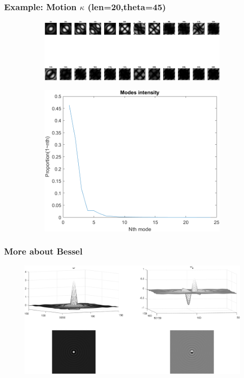 \documentclass[UTF8]{beamer}
\begin{document}
\begin{frame} \frametitle{Example: Motion $\kappa$ (len=20,theta=45)}
\begin{figure}[H]
\centering
\begin{subfigure}{1\textwidth}
    \centering
    \includegraphics[width=0.9\linewidth]{../figures/ex_motion.png}  
    \label{fig:modes_u}
 \end{subfigure}
 \begin{subfigure}{1\textwidth}
    \centering
    \includegraphics[width=.5\linewidth]{../figures/ex_motion_s.png}  
    \label{fig:modes_u_phaze}
 \end{subfigure}
 \end{figure}
\end{frame}

\begin{frame} \frametitle{More about Bessel}
\begin{figure}[H]
\centering

    \includegraphics[width=0.9\linewidth]{../figures/bessel_cp.png}  
   
\end{figure}
\end{frame}

%
\end{document}
